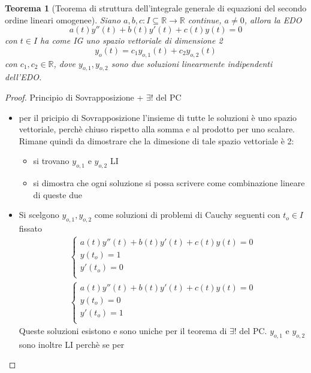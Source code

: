 \documentclass[12pt, a4paper]{article}
\theoremstyle{break}
\newtheorem{theorem}{Teorema} %
\begin{document}
\newpage
\begin{theorem} [Teorema di struttura dell’integrale generale di equazioni del
	secondo ordine lineari omogenee]
	Siano $a, b, c: I \subseteq \mathbb{R} \to \mathbb{R}$ continue, $a
		\neq 0$, allora la EDO
	\[
		a(t) y''(t) + b(t) y'(t) + c(t) y(t) = 0
	\]
	con $t \in I $ ha come IG uno spazio vettoriale di dimensione 2
	\[
		y_o(t) = c_1 y_{o,1}(t) + c_2 y_{o,2}(t)
	\]
	con $c_1, c_2 \in \mathbb{R}$, dove $y_{o,1}, y_{o,2}$ sono due soluzioni
	linearmente indipendenti dell'EDO.
\end{theorem}
\begin{proof} Principio di Sovrapposizione + $\exists !$ del PC
	\begin{itemize}
		\item per il pricipio di Sovrapposizione l'insieme di tutte le soluzioni
			è uno spazio vettoriale, perchè chiuso rispetto alla somma e al
			prodotto per uno scalare. Rimane quindi da dimostrare che la
			dimesione di tale spazio vettoriale è 2:
			\begin{itemize}
				\item si trovano $y_{o,1}$ e $y_{o,2}$ LI
				\item si dimostra che ogni soluzione si possa scrivere come
					combinazione lineare di queste due
			\end{itemize}
		\item Si scelgono $y_{o,1}, y_{o,2}$ come soluzioni di problemi di
			Cauchy seguenti con $t_o \in I$ fissato
			\begin{align*}
				\begin{cases}
					a(t) y''(t) + b(t) y'(t) + c(t) y(t) = 0 \\
					y(t_o) = 1                               \\
					y'(t_o) = 0                              \\
				\end{cases}
			\end{align*}
			\begin{align*}
				\begin{cases}
					a(t) y''(t) + b(t) y'(t) + c(t) y(t) = 0 \\
					y(t_o) = 0                               \\
					y'(t_o) = 1                              \\
				\end{cases}
			\end{align*}
			Queste soluzioni esistono e sono uniche per il teorema di $\exists
				!$ del PC. $y_{o,1}$ e $y_{o,2}$ sono inoltre LI perchè se per

\end{itemize}
\end{proof}
\end{document}
